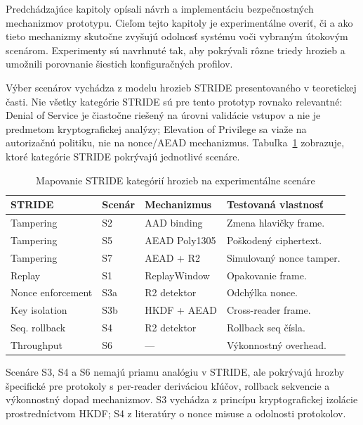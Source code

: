 Predchádzajúce kapitoly opísali návrh a implementáciu bezpečnostných mechanizmov prototypu. Cieľom tejto kapitoly je experimentálne overiť, či a ako tieto mechanizmy skutočne zvyšujú odolnosť systému voči vybraným útokovým scenárom. Experimenty sú navrhnuté tak, aby pokrývali rôzne triedy hrozieb a umožnili porovnanie šiestich konfiguračných profilov.

Výber scenárov vychádza z modelu hrozieb STRIDE\cite{STRIDE} presentovaného v teoretickej časti. Nie všetky kategórie STRIDE sú pre tento prototyp rovnako relevantné: Denial of Service je čiastočne riešený na úrovni validácie vstupov a nie je predmetom kryptografickej analýzy; Elevation of Privilege sa viaže na autorizačnú politiku, nie na nonce/AEAD mechanizmus. Tabuľka~\ref{tab:stride-scenarios} zobrazuje, ktoré kategórie STRIDE pokrývajú jednotlivé scenáre.

\begin{table}[H]
\renewcommand{\arraystretch}{1.3}
\centering
\caption{Mapovanie STRIDE kategórií hrozieb na experimentálne scenáre}
\label{tab:stride-scenarios}
\footnotesize
\begin{tabular}{l l l p{3.8cm}}
\toprule
\textbf{STRIDE} & \textbf{Scenár} & \textbf{Mechanizmus} & \textbf{Testovaná vlastnosť} \\
\midrule
Tampering & S2 & AAD binding & Zmena hlavičky frame. \\
Tampering & S5 & AEAD Poly1305 & Poškodený ciphertext. \\
Tampering & S7 & AEAD + R2 & Simulovaný nonce tamper. \\
Replay & S1 & ReplayWindow & Opakovanie frame. \\
Nonce enforcement & S3a & R2 detektor & Odchýlka nonce. \\
Key isolation & S3b & HKDF + AEAD & Cross-reader frame. \\
Seq. rollback & S4 & R2 detektor & Rollback seq čísla. \\
Throughput & S6 & --- & Výkonnostný overhead. \\
\bottomrule
\end{tabular}
\end{table}

\noindent Scenáre S3, S4 a S6 nemajú priamu analógiu v STRIDE, ale pokrývajú hrozby špecifické pre protokoly s per-reader deriváciou kľúčov, rollback sekvencie a výkonnostný dopad mechanizmov. S3 vychádza z princípu kryptografickej izolácie prostredníctvom HKDF\cite{RFC5869}; S4 z literatúry o nonce misuse a odolnosti protokolov\cite{RogawayNonceMisuse2004,BellareNonceMisuse2006}.

